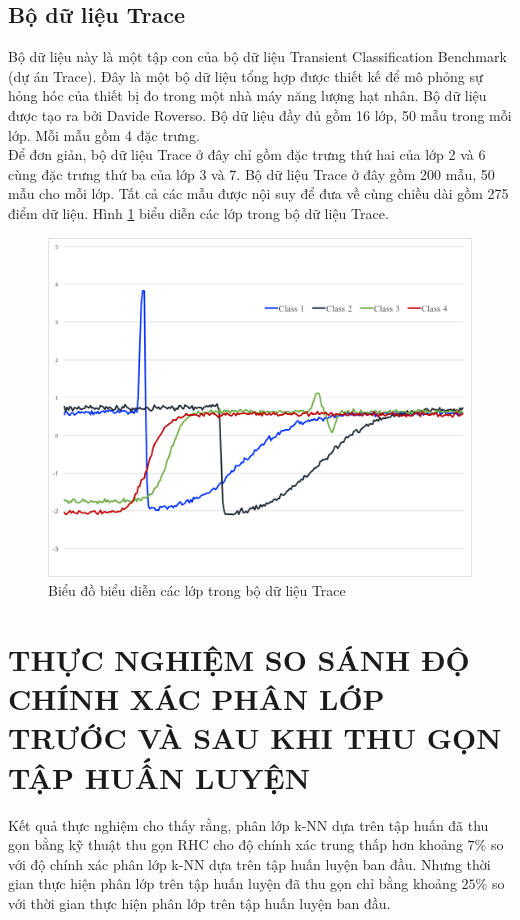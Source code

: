 \documentclass[13pt,oneside]{scrbook}
\begin{document}
\subsection{Bộ dữ liệu Trace}
Bộ dữ liệu này là một tập con của bộ dữ liệu Transient Classification Benchmark (dự án Trace). Đây là một bộ dữ liệu tổng hợp được thiết kế để mô phỏng sự hỏng hóc của thiết bị đo trong một nhà máy năng lượng hạt nhân. Bộ dữ liệu được tạo ra bởi Davide Roverso. Bộ dữ liệu đầy đủ gồm 16 lớp, 50 mẫu trong mỗi lớp. Mỗi mẫu gồm 4 đặc trưng. \\
Để đơn giản, bộ dữ liệu Trace ở đây chỉ gồm đặc trưng thứ hai của lớp 2 và 6 cùng đặc trưng thứ ba của lớp 3 và 7. Bộ dữ liệu Trace ở đây gồm 200 mẫu, 50 mẫu cho mỗi lớp. Tất cả các mẫu được nội suy để đưa về cùng chiều dài gồm 275 điểm dữ liệu.
Hình \ref{Trace_Graph.png} biểu diễn các lớp trong bộ dữ liệu Trace.
\begin{figure}[H]
	\begin{center}
		\includegraphics[width=130mm]{Trace_Graph.png}
		\caption{Biểu đồ biểu diễn các lớp trong bộ dữ liệu Trace} 
		\label{Trace_Graph.png}
	\end{center}
\end{figure}
\section{THỰC NGHIỆM SO SÁNH ĐỘ CHÍNH XÁC PHÂN LỚP TRƯỚC VÀ SAU KHI THU GỌN TẬP HUẤN LUYỆN}
Kết quả thực nghiệm cho thấy rằng, phân lớp k-NN dựa trên tập huấn đã thu gọn bằng kỹ thuật thu gọn RHC cho độ chính xác trung  thấp hơn khoảng $7\%$ so với độ chính xác phân lớp k-NN dựa trên tập huấn luyện ban đầu.
Nhưng thời gian thực hiện phân lớp trên tập huấn luyện đã thu gọn chỉ bằng khoảng $25\%$ so với thời gian thực hiện phân lớp trên tập huấn luyện ban đầu.
\end{document}

